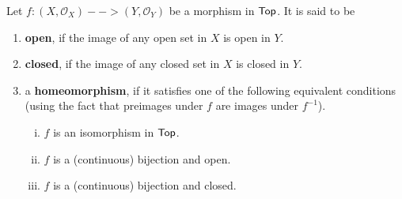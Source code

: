 \begin{definition}
	Let $f:(X, \mathcal{O}_X) --> (Y, \mathcal{O}_Y)$ be a morphism in $\textsf{Top}$. It is said to be
	\begin{enumerate}[$\bullet$]
		\item{
			\textbf{open}, if the image of any open set in $X$ is open in $Y$.
		}
		\item{
			\textbf{closed}, if the image of any closed set in $X$ is closed in $Y$.
		}
		\item{
			a \textbf{homeomorphism}, if it satisfies one of the following equivalent conditions (using the fact that preimages under $f$ are images under $f^{-1}$).
			\begin{enumerate}[(i)]
				\item{
					$f$ is an isomorphism in $\textsf{Top}$.
				}
				\item{
					$f$ is a (continuous) bijection and open.
				}
				\item{
					$f$ is a (continuous) bijection and closed.
				}
			\end{enumerate}
		}
	\end{enumerate}
\end{definition}


